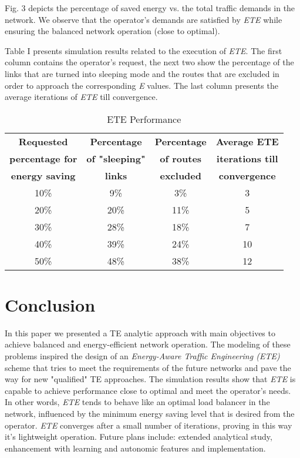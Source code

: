 \documentclass[journal]{IEEEtran}
\begin{document}
Fig. 3 depicts the percentage of saved energy vs. the total traffic demands in the network. We observe that the operator's demands are satisfied by \emph{ETE} while ensuring the balanced network operation (close to optimal).

Table I presents simulation results related to the execution of \emph{ETE}. The first column contains the operator's request, the next two show the percentage of the links that are turned into sleeping mode and the routes that are excluded in order to approach the corresponding \emph{E} values. The last column presents the average iterations of \emph{ETE} till convergence.

\begin{table}\vspace{-0.2in}
\caption{ETE Performance} {\footnotesize
\vspace{-0.2in}
\begin{center}
\begin{tabular}{|c|c|c|c|}
  \hline
  \textbf{Requested} & \textbf{Percentage} & \textbf{Percentage} & \textbf{Average ETE } \\
  \textbf{percentage for} & \textbf{of "sleeping"} & \textbf{of routes} & \textbf{iterations till}\\
  \textbf{energy saving} & \textbf{links} & \textbf{excluded} & \textbf{convergence}\\
  \hline
  10\% & 9\% & 3\% & 3  \\
  \hline
  20\% & 20\% & 11\% & 5  \\
  \hline
  30\% & 28\% & 18\% & 7  \\
  \hline
  40\% & 39\% & 24\% & 10  \\
  \hline
  50\% & 48\% & 38\% & 12  \\
\hline
\end{tabular}
\end {center}}
\vspace{-0.2in}
\end{table}

\section{Conclusion}
In this paper we presented a TE analytic approach with main objectives to achieve balanced and energy-efficient network operation. The modeling of these problems inspired the design of an \emph{Energy-Aware Traffic Engineering (ETE)} scheme that tries to meet the requirements of the future networks and pave the way for new "qualified" TE approaches. The simulation results show that \emph{ETE} is capable to achieve performance close to optimal and meet the operator's needs. In other words, \emph{ETE} tends to behave like an optimal load balancer in the network, influenced by the minimum energy saving level that is desired from the operator. \emph{ETE} converges after a small number of iterations, proving in this way it's lightweight operation. Future plans include: extended analytical study, enhancement with learning and autonomic features and implementation.
\end{document}
